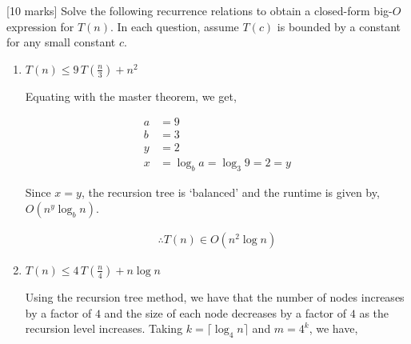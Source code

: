 {[10 marks]} Solve the following recurrence relations to obtain a closed-form big-$O$ expression for $T(n)$.
In each question, assume $T(c)$ is bounded by a constant for any small constant $c$.

\begin{enumerate}
    \item $T(n) \le 9\,T(\frac{n}{3}) + n^2$

          Equating with the master theorem, we get,

          \begin{align*}
              a & = 9                             \\
              b & = 3                             \\
              y & = 2                             \\
              x & = \log_b{a} = \log_3{9} = 2 = y
          \end{align*}

          Since $x = y$, the recursion tree is `balanced' and the runtime is given by, $O\left( n^y \log_b{n} \right)$.

          \begin{align*}
              \therefore T(n) \in O\left( n^2 \log{n} \right)
          \end{align*}

    \item $T(n) \le 4\,T(\frac{n}{4}) + n \log n$

          Using the recursion tree method, we have that the number of nodes increases by a factor of $4$ and
          the size of each node decreases by a factor of $4$ as the recursion level increases.
          Taking $k = \lceil \log_4{n} \rceil$ and $m = 4^k$, we have,


\end{enumerate}
